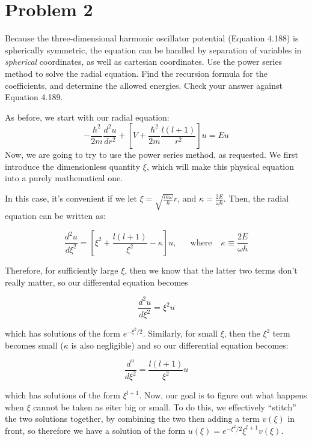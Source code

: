 \documentclass[10pt]{article}
\begin{document}
    \pagebreak


    \section*{Problem 2} 

    Because the three-dimensional harmonic oscillator potential (Equation 4.188) is spherically symmetric, the \schrodinger equation can be handled by separation of variables in \textit{spherical} coordinates, as well as cartesian coordinates. Use the power series method to solve the radial equation. Find the recursion formula for the coefficients, and determine the allowed energies. Check your answer against Equation 4.189.

    \begin{solution}
        As before, we start with our radial equation:
        \[-\frac{\hbar^2}{2m} \frac{d^2u}{dr^2} + \left[ V + \frac{\hbar^2}{2m} \frac{l(l+1)}{r^2}\right]u = Eu\]
        Now, we are going to try to use the power series method, as requested. We first introduce the dimensionless quantity $\xi$, which will make this physical equation into a purely mathematical one. 
        
        In this case, it's convenient if we let $\xi = \sqrt{\frac{m\omega}{\hbar}}r$, and $\kappa = \frac{2E}{\omega \hbar}$. Then, the radial equation can be written as: 


        \[\frac{d^2u}{d\xi^2} = \left[\xi^2 + \frac{l(l+1)}{\xi^2} - \kappa\right]u,\phantom{aaa}\text{where}\phantom{aa} \kappa \equiv \frac{2E}{\omega\hbar}\]

        Therefore, for sufficiently large $\xi$, then we know that the latter two terms don't really matter, so our differental equation becomes 

        \[ \frac{d^2u}{d\xi^2} = \xi^2 u\]

        which has solutions of the form $e^{-\xi^2/2}$. Similarly, for small $\xi$, then the $\xi^2$ term becomes small ($\kappa$ is also negligible) and so our differential equation becomes: 

        \[ \frac{d^u}{d\xi^2} = \frac{l(l+1)}{\xi^2}u\] 

        which has solutions of the form $\xi^{l+1}$. Now, our goal is to figure out what happens when $\xi$ cannot be taken as eiter big or small. To do this, we effectively ``stitch'' the two solutions together, by combining the two then adding a term $v(\xi)$ in front, so therefore we have a solution of the form $u(\xi) = e^{-\xi^2/2}\xi^{l+1}v(\xi)$. 


\end{solution}
\end{document}
